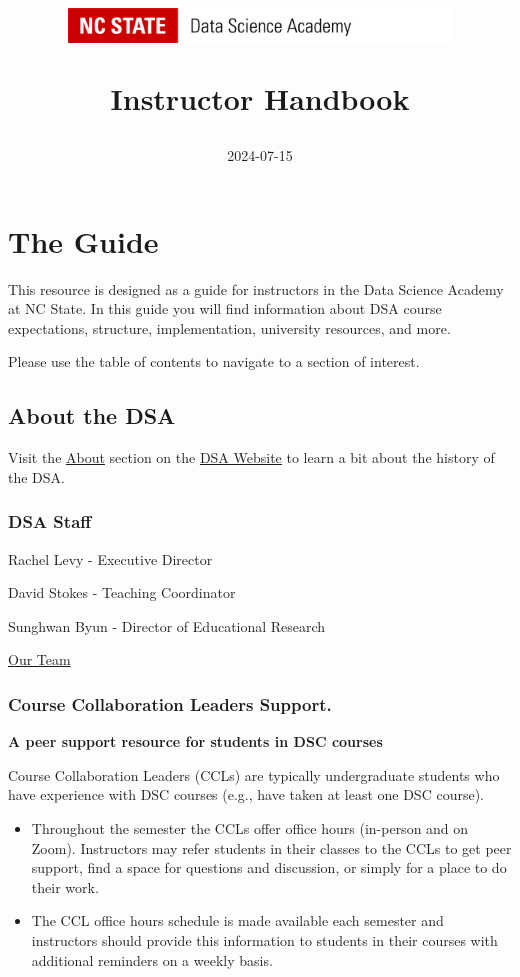 \documentclass[
]{book}
\title{\includegraphics[width=4in,height=\textheight]{DSA Logo.png}

Instructor Handbook}
\author{2024-07-15}
\date{}
\providecommand{\tightlist}{%
  \setlength{\itemsep}{0pt}\setlength{\parskip}{0pt}}
\begin{document}
\maketitle

{
\setcounter{tocdepth}{1}
\tableofcontents
}
\chapter{The Guide}\label{the-guide}

This resource is designed as a guide for instructors in the Data Science Academy at NC State. In this guide you will find information about DSA course expectations, structure, implementation, university resources, and more.

Please use the table of contents to navigate to a section of interest.

\section{About the DSA}\label{about-the-dsa}

Visit the \href{https://datascienceacademy.ncsu.edu/about/}{About} section on the \href{https://datascienceacademy.ncsu.edu/}{DSA Website} to learn a bit about the history of the DSA.

\subsection{DSA Staff}\label{dsa-staff}

Rachel Levy - Executive Director

David Stokes - Teaching Coordinator

Sunghwan Byun - Director of Educational Research

\href{https://datascienceacademy.ncsu.edu/about/our-team/}{Our Team}

\subsection{Course Collaboration Leaders Support.}\label{course-collaboration-leaders-support.}

\textbf{A peer support resource for students in DSC courses}

Course Collaboration Leaders (CCLs) are typically undergraduate students who have experience with DSC courses (e.g., have taken at least one DSC course).

\begin{itemize}
\tightlist
\item
  Throughout the semester the CCLs offer office hours (in-person and on Zoom). Instructors may refer students in their classes to the CCLs to get peer support, find a space for questions and discussion, or simply for a place to do their work.
\item
  The CCL office hours schedule is made available each semester and instructors should provide this information to students in their courses with additional reminders on a weekly basis.
\end{itemize}
\end{document}
